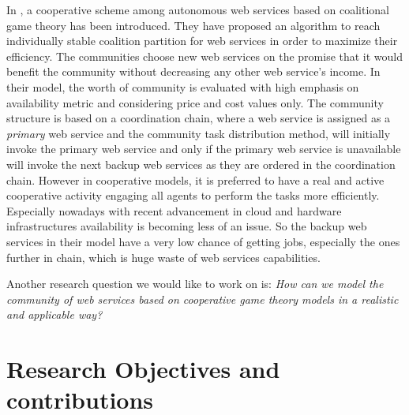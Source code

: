 In \cite{10.1109/TSC.2012.12}, a cooperative scheme among autonomous
web services based on coalitional game theory has been introduced. They have proposed an algorithm to
reach individually stable coalition partition for web services in order to
maximize their efficiency. The communities choose new web services on the promise
that it would benefit the community without decreasing any other web service's
income. In their model, the worth of community is evaluated with high emphasis on
availability metric and considering price and cost values only. The community structure is based on a coordination chain,
where a web service is assigned as a \emph{primary} web service and the community task distribution
method, will initially invoke the primary web service and only if the primary web service is unavailable
will invoke the next backup web services as they are ordered in the coordination chain. However in cooperative models, it is preferred to
have a real and active cooperative activity engaging all agents to perform the tasks more efficiently. Especially nowadays
with recent advancement in cloud and hardware infrastructures availability is becoming less of an issue. So the backup web services
in their model have a very low chance of getting jobs, especially the ones further in chain, which is huge waste of web services
capabilities.

Another research question we would like to work on is:
\emph{How can we model the community of web services based on cooperative game theory models in a realistic and applicable way?}


\section{Research Objectives and contributions}\label{sec:motexample}

